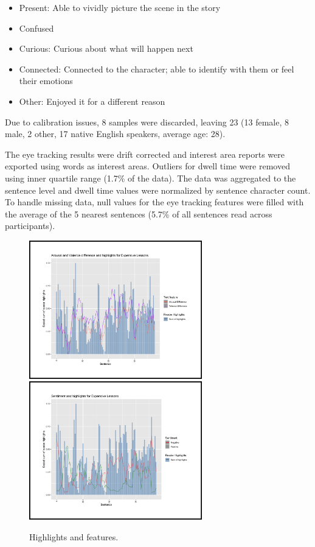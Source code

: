 \documentclass[11pt]{article}
\begin{document}
\begin{itemize}
  \item Present: Able to vividly picture the scene in the story
  \item Confused
  \item Curious: Curious about what will happen next
  \item Connected: Connected to the character; able to identify with them or feel their emotions
  \item Other: Enjoyed it for a different reason
\end{itemize}

Due to calibration issues, 8 samples were discarded, leaving 23 (13 female, 8 male, 2 other, 17 native English speakers, average age: 28).

The eye tracking results were drift corrected and interest area reports were exported using words as interest areas. Outliers for dwell time were removed using inner quartile range (1.7\% of the data). The data was aggregated to the sentence level and dwell time values were normalized by sentence character count. To handle missing data, null values for the eye tracking features were filled with the average of the 5 nearest sentences (5.7\% of all sentences read across participants).

\begin{figure}[h]
  \includegraphics[height=6cm]{el_highlights_val_arousal}
  \includegraphics[height=6cm]{el_highlights_sentiment}
  \caption{Highlights and features.}
\end{figure}
\end{document}
